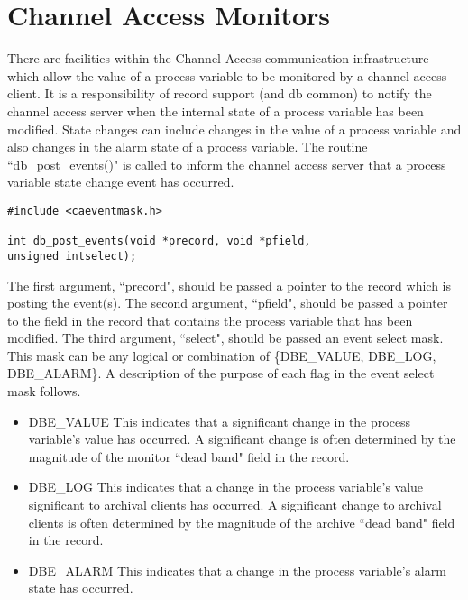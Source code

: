 \section{Channel Access Monitors}

There are facilities within the Channel Access communication infrastructure which allow the value of a process variable 
to be monitored by a channel access client. It is a responsibility of record support (and db common) to notify the channel 
access server when the internal state of a process variable has been modified. State changes can include changes in the 
value of a process variable and also changes in the alarm state of a process variable. The routine ``db\_post\_events()" is 
called to inform the channel access server that a process variable state change event has occurred.

\begin{verbatim}
#include <caeventmask.h>

int db_post_events(void *precord, void *pfield,
unsigned intselect);
\end{verbatim}

The first argument, ``precord", should be passed a pointer to the record which is posting the event(s). The second 
argument, ``pfield", should be passed a pointer to the field in the record that contains the process variable that has been 
modified. The third argument, ``select", should be passed an event select mask. This mask can be any logical or 
combination of \{DBE\_VALUE, DBE\_LOG, DBE\_ALARM\}. A description of the purpose of each flag in the event select 
mask follows.

\begin{itemize}
\item DBE\_VALUE This indicates that a significant change in the process variable's value has occurred. A significant 
change is often determined by the magnitude of the monitor ``dead band" field in the record.

\item DBE\_LOG This indicates that a change in the process variable's value significant to archival clients has occurred. 
A significant change to archival clients is often determined by the magnitude of the archive ``dead band" field in 
the record.

\item DBE\_ALARM This indicates that a change in the process variable's alarm state has occurred.

\end{itemize}

